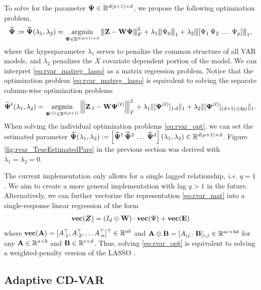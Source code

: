 To solve for the parameter $\bm{\Psi}\in\mathbb{R}^{d (p+1) \times d}$, we propose the following optimization problem,
\begin{equation}\label{eq:rvar_matreg_lasso}
	\widehat{\bm{\Psi}} := \widehat{\bm{\Psi}}(\lambda_1,\lambda_2) = \mathop{\mathrm{argmin}}_{\bm{\Psi}\in \mathbb{R}^{d (p+1) \times d}} {\left\vert\kern-0.25ex\left\vert\kern-0.25ex\left\vert  \mathbf{Z} - \mathbf{W} \bm{\Psi}  \right\vert\kern-0.25ex\right\vert\kern-0.25ex\right\vert}_{F}^2 + \lambda_1 {\left\vert\kern-0.25ex\left\vert\kern-0.25ex\left\vert \Psi_{0} \right\vert\kern-0.25ex\right\vert\kern-0.25ex\right\vert}_1 +  \lambda_2 {\left\vert\kern-0.25ex\left\vert\kern-0.25ex\left\vert [\Psi_1 \, \Psi_2 \, \ldots \, \Psi_p] \right\vert\kern-0.25ex\right\vert\kern-0.25ex\right\vert}_1,
\end{equation}
where the hyperparameter $\lambda_1$ serves to penalize the common structure of all VAR models, and $\lambda_2$ penalizes the $X$ covariate dependent portion of the model. We can interpret \eqref{eq:rvar_matreg_lasso} as a matrix regression problem. Notice that the optimization problem \eqref{eq:rvar_matreg_lasso} is equivalent to solving the separate column-wise optimization problems
\begin{equation}\label{eq:rvar_opt}
	\widehat{\bm{\Psi}}^{\ell}(\lambda_1,\lambda_2) = \mathop{\mathrm{argmin}}_{\bm{\Psi}^{(\ell)} \in \mathbb{R}^{d (p+1)}} {\left\vert\kern-0.25ex\left\vert\kern-0.25ex\left\vert  \mathbf{Z}_{\cdot \ell} - \mathbf{W} \bm{\Psi}^{(\ell)}  \right\vert\kern-0.25ex\right\vert\kern-0.25ex\right\vert}_{F}^2 + \lambda_1 \|{[\bm{\Psi}^{(\ell)}]_{1:d}}\|_1 +  \lambda_2 \|{[\bm{\Psi}^{(\ell)}]_{(d+1):(dp)}}\|_1.
\end{equation}
When solving the individual optimization problems \eqref{eq:rvar_opt}, we can set the estimated parameter $\widehat{\bm{\Psi}}(\lambda_1,\lambda_2) := \left[\widehat{\bm{\Psi}}^{1}\, \widehat{\bm{\Psi}}^{2}\,\ldots \, \widehat{\bm{\Psi}}^{d}\right](\lambda_1,\lambda_2)\in\mathbb{R}^{d(p+1)\times d}$. Figure \ref{fig:rvar_TrueEstimatedPars} in the previous section was derived with $\lambda_1 = \lambda_2 = 0$.

The current implementation only allows for a single lagged relationship, \textit{i.e.} $q = 1$. We aim to create a more general implementation with lag $q> 1$ in the future. Alternatively, we can further vectorize the representation \eqref{eq:rvar_mat} into a single-response linear regression of the form 
\begin{align*}
	\textbf{vec}(\bm{Z}) =  ( I_d \otimes  \mathbf{W} )  \cdot \textbf{vec}(\Psi) + \textbf{vec}(\mathbf{E})
\end{align*}
where $\textbf{vec}(\mathbf{A}) = [A_{\cdot 1}^\top , A_{\cdot 2}^\top ,  \ldots A_{\cdot n}^\top]^\top\in\mathbb{R}^{ab}$ and $\mathbf{A} \otimes \mathbf{B} = [A_{ij}\cdot \mathbf{B}]_{i,j}\in\mathbb{R}^{ac \times bd}$ for any $\mathbf{A}\in\mathbb{R}^{a\times b}$ and $\mathbf{B} \in \mathbb{R}^{c\times d}$. Thus, solving \eqref{eq:rvar_opt} is equivalent to solving a weighted-penalty version of the LASSO .

\subsection{Adaptive CD-VAR}\label{subsec:adaptiveCDVAR}

